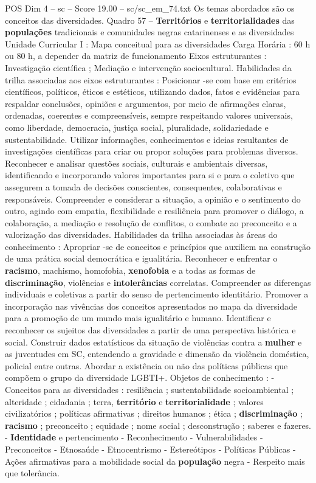\begin{textsample}{POS Dim 4 – sc – Score 19.00 – sc/sc\_em\_74.txt}
Os temas abordados são os conceitos das diversidades.
Quadro 57 – \textbf{Territórios} e \textbf{territorialidades} das \textbf{populações} tradicionais e comunidades negras catarinenses e as diversidades Unidade Curricular I : Mapa conceitual para as diversidades Carga Horária : 60 h ou 80 h, a depender da matriz de funcionamento Eixos estruturantes : Investigação científica ; Mediação e intervenção sociocultural.
Habilidades da trilha associadas aos eixos estruturantes : Posicionar -se com base em critérios científicos, políticos, éticos e estéticos, utilizando dados, fatos e evidências para respaldar conclusões, opiniões e argumentos, por meio de afirmações claras, ordenadas, coerentes e compreensíveis, sempre respeitando valores universais, como liberdade, democracia, justiça social, pluralidade, solidariedade e sustentabilidade.
Utilizar informações, conhecimentos e ideias resultantes de investigações científicas para criar ou propor soluções para problemas diversos.
Reconhecer e analisar questões sociais, culturais e ambientais diversas, identificando e incorporando valores importantes para si e para o coletivo que assegurem a tomada de decisões conscientes, consequentes, colaborativas e responsáveis.
Compreender e considerar a situação, a opinião e o sentimento do outro, agindo com empatia, flexibilidade e resiliência para promover o diálogo, a colaboração, a mediação e resolução de conflitos, o combate ao preconceito e a valorização das diversidades.
Habilidades da trilha associadas às áreas do conhecimento : Apropriar -se de conceitos e princípios que auxiliem na construção de uma prática social democrática e igualitária.
Reconhecer e enfrentar o \textbf{racismo}, machismo, homofobia, \textbf{xenofobia} e a todas as formas de \textbf{discriminação}, violências e \textbf{intolerâncias} correlatas.
Compreender as diferenças individuais e coletivas a partir do senso de pertencimento identitário.
Promover a incorporação nas vivências dos conceitos apresentados no mapa da diversidade para a promoção de um mundo mais igualitário e humano.
Identificar e reconhecer os sujeitos das diversidades a partir de uma perspectiva histórica e social.
Construir dados estatísticos da situação de violências contra a \textbf{mulher} e as juventudes em SC, entendendo a gravidade e dimensão da violência doméstica, policial entre outras.
Abordar a existência ou não das políticas públicas que compõem o grupo da diversidade LGBTI+.
Objetos de conhecimento : - Conceitos para as diversidades : resiliência ; sustentabilidade socioambiental ; alteridade ; cidadania ; terra, \textbf{território} e \textbf{territorialidade} ; valores civilizatórios ; políticas afirmativas ; direitos humanos ; ética ; \textbf{discriminação} ; \textbf{racismo} ; preconceito ; equidade ; nome social ; desconstrução ; saberes e fazeres. - \textbf{Identidade} e pertencimento - Reconhecimento - Vulnerabilidades - Preconceitos - Etnosaúde - Etnocentrismo - Estereótipos - Políticas Públicas - Ações afirmativas para a mobilidade social da \textbf{população} negra - Respeito mais que tolerância.

\end{textsample}
